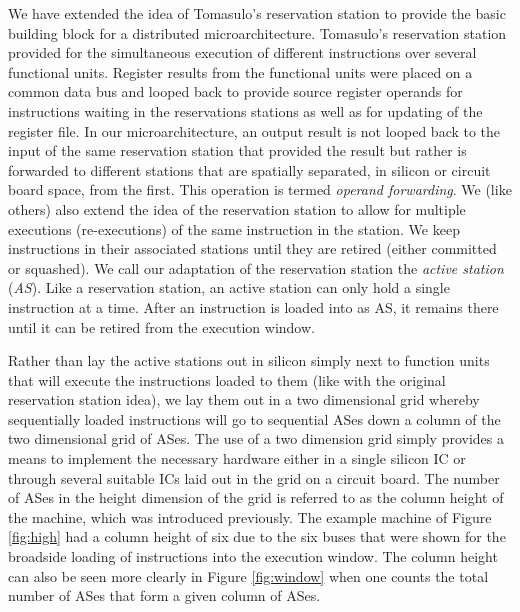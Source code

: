 \documentclass[10pt,dvips]{article}
\begin{document}
We have extended the idea of Tomasulo's reservation
station \cite{Tom67} to provide the basic building block for a distributed
microarchitecture.  Tomasulo's reservation station provided for the
simultaneous execution of different instructions over several
functional units.  
Register results from the functional units were placed on
a common data bus and looped back to provide source register operands 
for instructions waiting in the reservations stations as well as
for updating of the register file.  In our microarchitecture,
an output result is not looped back to the input of the same reservation
station
that provided the result but rather is forwarded to different
stations that are spatially separated, in silicon or circuit board space,
from the first.  
This operation is termed \textit{operand forwarding}.
We (like others)
also extend the idea of the reservation station to allow for multiple
executions (re-executions) of the same instruction in the station.  We
keep instructions in their associated stations until they are
retired (either committed or squashed).  We call our adaptation of the
reservation station the \textit{active station} (\textit{AS}).
Like a reservation station, an active station can only hold a single
instruction at a time.  After an instruction is loaded into
as AS, it remains there until it can be retired from the execution
window.

Rather than lay the active stations out in silicon simply next to
function units that will execute the instructions loaded to them
(like with the original reservation station idea),
we lay them out in a two dimensional grid whereby sequentially
loaded instructions will go to sequential ASes down a column of
the two dimensional grid of ASes.  
The use of a two dimension
grid simply provides a means to implement the necessary
hardware either in a single silicon IC or through several
suitable ICs laid out in the grid on a circuit board.
The number of ASes in the height dimension of the grid is referred to
as the column height of the machine, which was introduced
previously.
The example machine of Figure \ref{fig:high} had a column height of
six due to the six buses that were shown for the broadside loading of 
instructions into the execution window.
The column height can also be seen more clearly in 
Figure \ref{fig:window} when one counts the total
number of ASes that form a given column of ASes.
\end{document}
